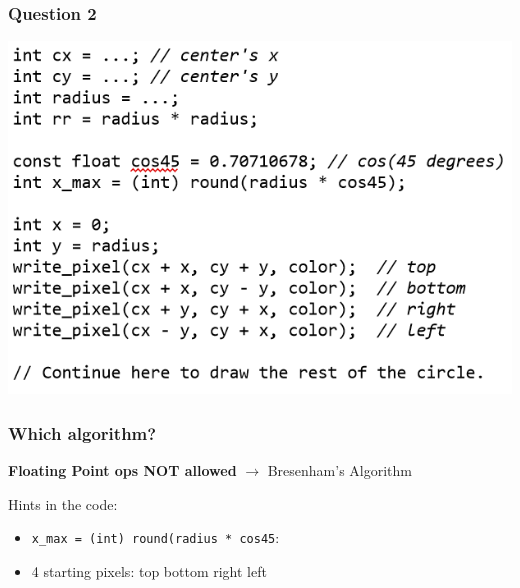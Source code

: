 \documentclass{beamer}
\begin{document}
\begin{frame}
    \frametitle{Question 2}

    \begin{center}
        \includegraphics[scale=0.8]{q2.png}
    \end{center}

\end{frame}

\begin{frame}
    \frametitle{Which algorithm?}

    \textbf{Floating Point ops NOT allowed} $\rightarrow$ Bresenham's Algorithm

    Hints in the code:
    \begin{itemize}
        \item \texttt{x\_max = (int) round(radius * cos45}: 
        \item 4 starting pixels: top bottom right left
    \end{itemize}

\end{frame}
\end{document}
